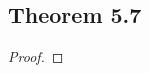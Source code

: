 \documentclass[../../main.tex]{subfiles}
\begin{document}
\subsection{Theorem 5.7}
\begin{wts}

\end{wts}
\begin{proof}

\end{proof}
\end{document}
